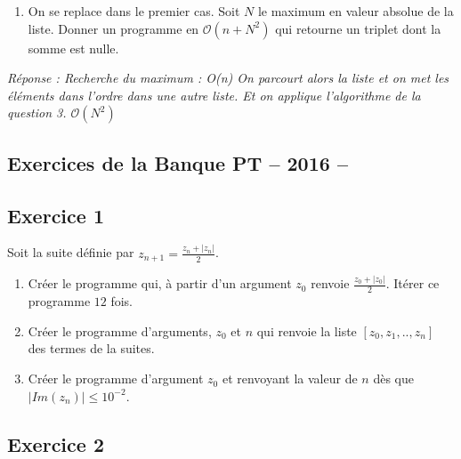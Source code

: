 \documentclass[10pt,fleqn]{article} %
\begin{document}
\begin{multicols}{2}
\begin{enumerate}
\item On se replace dans le premier cas. 
Soit $N$ le maximum en valeur absolue de la liste.
Donner un programme en $\mathcal{O}(n+N^2)$ qui retourne un triplet dont la somme est  nulle. 
\end{enumerate}
\textit{
Réponse : 
Recherche du maximum : O(n)
On parcourt alors la liste et on met les éléments dans l’ordre dans une autre liste.
Et on applique l’algorithme de la question 3. $\mathcal{O}(N^2)$}


\end{multicols}

\newpage 
\begin{multicols}{2}
\section{Exercices de la Banque PT -- 2016 -- }
\subsection*{Exercice 1}
Soit la suite définie par $z_{n+1}=\frac{z_n+|z_n|}{2}$.
\begin{enumerate}
\item Créer le programme qui, à partir d'un argument $z_0$ renvoie 
$\frac{z_0+|z_0|}{2}$. Itérer ce programme $12$ fois.
\item Créer le programme d'arguments, $z_0$ et $n$ qui renvoie
la liste $[z_0,z_1,..,z_n]$ des termes de la suites.
\item Créer le programme d'argument $z_0$ et renvoyant la valeur de $n$ dès que 
$|Im(z_n)|\leq 10^{-2}$.
\end{enumerate}


\subsection*{Exercice 2}


\end{multicols}
\end{document}
